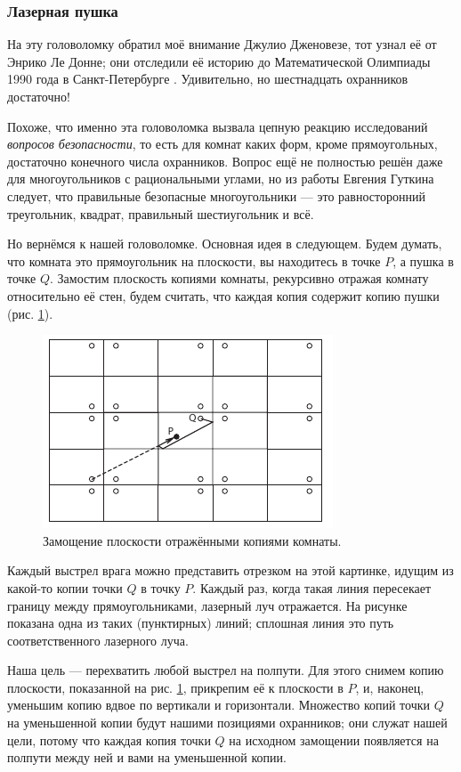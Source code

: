 \subsubsection*{Лазерная пушка}

На эту головоломку обратил моё внимание Джулио Дженовезе, тот узнал её от Энрико Ле Донне;
они отследили её историю до Математической Олимпиады 1990 года в Санкт-Петербурге \cite{fomin-kokhas}.
Удивительно, но шестнадцать охранников достаточно!

Похоже, что именно эта головоломка вызвала цепную реакцию исследований \emph{вопросов безопасности}, то есть для комнат каких форм, кроме прямоугольных, достаточно конечного числа охранников.
Вопрос ещё не полностью решён даже для многоугольников с рациональными углами, но из работы Евгения Гуткина \cite{gutkin} следует, что правильные безопасные многоугольники --- это равносторонний треугольник, квадрат, правильный шестиугольник и всё.

Но вернёмся к нашей головоломке.
Основная идея в следующем.
Будем думать, что комната это прямоугольник на плоскости, вы находитесь в точке $P$, а пушка в точке $Q$.
Замостим плоскость копиями комнаты, рекурсивно отражая комнату относительно её стен, будем считать, что каждая копия содержит копию пушки (рис. \ref{pic:room1}).

\begin{figure}[h!]
\centering
\includegraphics[scale=1]{pics/room1}
\caption{Замощение плоскости отражёнными копиями комнаты.}
\label{pic:room1}
\end{figure}

Каждый выстрел врага можно представить отрезком на этой картинке, идущим из какой-то копии точки $Q$ в точку $P$.
Каждый раз, когда такая линия пересекает границу между прямоугольниками, лазерный луч отражается.
На рисунке показана одна из таких (пунктирных) линий; сплошная линия это путь соответственного лазерного луча.

Наша цель --- перехватить любой выстрел на полпути.
Для этого снимем копию плоскости, показанной на рис. \ref{pic:room1}, прикрепим её к плоскости в $P$, и, наконец, уменьшим копию вдвое по вертикали и горизонтали.
Множество копий точки $Q$ на уменьшенной копии будут нашими позициями охранников; они служат нашей цели, потому что каждая копия точки $Q$ на исходном замощении появляется на полпути между ней и вами на уменьшенной копии.


